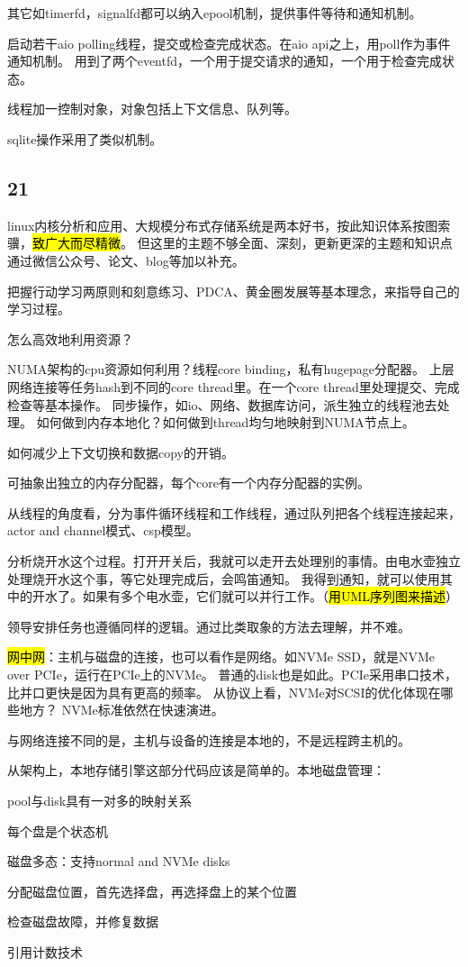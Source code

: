 其它如timerfd，signalfd都可以纳入epool机制，提供事件等待和通知机制。

启动若干aio polling线程，提交或检查完成状态。在aio api之上，用poll作为事件通知机制。
用到了两个eventfd，一个用于提交请求的通知，一个用于检查完成状态。

线程加一控制对象，对象包括上下文信息、队列等。

sqlite操作采用了类似机制。

\subsection{21}

linux内核分析和应用、大规模分布式存储系统是两本好书，按此知识体系按图索骥，\hl{致广大而尽精微}。
但这里的主题不够全面、深刻，更新更深的主题和知识点通过微信公众号、论文、blog等加以补充。

把握行动学习两原则和刻意练习、PDCA、黄金圈发展等基本理念，来指导自己的学习过程。

怎么高效地利用资源？

NUMA架构的cpu资源如何利用？线程core binding，私有hugepage分配器。
上层网络连接等任务hash到不同的core thread里。在一个core thread里处理提交、完成检查等基本操作。
同步操作，如io、网络、数据库访问，派生独立的线程池去处理。
如何做到内存本地化？如何做到thread均匀地映射到NUMA节点上。

如何减少上下文切换和数据copy的开销。

可抽象出独立的内存分配器，每个core有一个内存分配器的实例。

从线程的角度看，分为事件循环线程和工作线程，通过队列把各个线程连接起来，actor and channel模式、csp模型。

分析烧开水这个过程。打开开关后，我就可以走开去处理别的事情。由电水壶独立处理烧开水这个事，等它处理完成后，会鸣笛通知。
我得到通知，就可以使用其中的开水了。如果有多个电水壶，它们就可以并行工作。（\hl{用UML序列图来描述}）

领导安排任务也遵循同样的逻辑。通过比类取象的方法去理解，并不难。

\hl{网中网}：主机与磁盘的连接，也可以看作是网络。如NVMe SSD，就是NVMe over PCIe，运行在PCIe上的NVMe。
普通的disk也是如此。PCIe采用串口技术，比并口更快是因为具有更高的频率。
从协议上看，NVMe对SCSI的优化体现在哪些地方？ NVMe标准依然在快速演进。

与网络连接不同的是，主机与设备的连接是本地的，不是远程跨主机的。

从架构上，本地存储引擎这部分代码应该是简单的。本地磁盘管理：
\begin{enumbox}
\item pool与disk具有一对多的映射关系
\item 每个盘是个状态机
\item 磁盘多态：支持normal and NVMe disks
\item 分配磁盘位置，首先选择盘，再选择盘上的某个位置
\item 检查磁盘故障，并修复数据
\item 引用计数技术
\end{enumbox}

